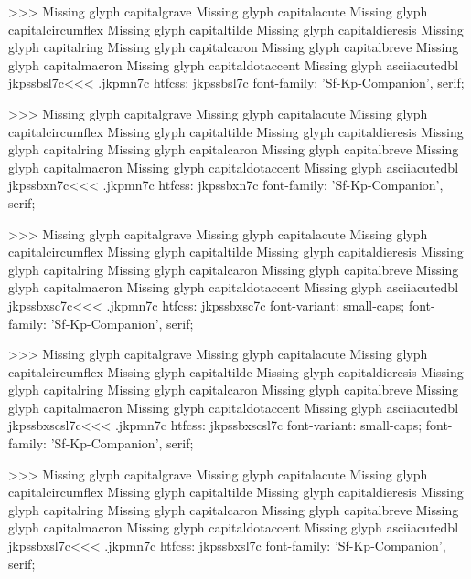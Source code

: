 >>>
Missing glyph	capitalgrave
Missing glyph	capitalacute
Missing glyph	capitalcircumflex
Missing glyph	capitaltilde
Missing glyph	capitaldieresis
Missing glyph	capitalring
Missing glyph	capitalcaron
Missing glyph	capitalbreve
Missing glyph	capitalmacron
Missing glyph	capitaldotaccent
Missing glyph	asciiacutedbl
\<jkpssbsl7c\><<<
.jkpmn7c
htfcss:  jkpssbsl7c  font-family: 'Sf-Kp-Companion', serif;

>>>
Missing glyph	capitalgrave
Missing glyph	capitalacute
Missing glyph	capitalcircumflex
Missing glyph	capitaltilde
Missing glyph	capitaldieresis
Missing glyph	capitalring
Missing glyph	capitalcaron
Missing glyph	capitalbreve
Missing glyph	capitalmacron
Missing glyph	capitaldotaccent
Missing glyph	asciiacutedbl
\<jkpssbxn7c\><<<
.jkpmn7c
htfcss:  jkpssbxn7c  font-family: 'Sf-Kp-Companion', serif;

>>>
Missing glyph	capitalgrave
Missing glyph	capitalacute
Missing glyph	capitalcircumflex
Missing glyph	capitaltilde
Missing glyph	capitaldieresis
Missing glyph	capitalring
Missing glyph	capitalcaron
Missing glyph	capitalbreve
Missing glyph	capitalmacron
Missing glyph	capitaldotaccent
Missing glyph	asciiacutedbl
\<jkpssbxsc7c\><<<
.jkpmn7c
htfcss:  jkpssbxsc7c  font-variant: small-caps; font-family: 'Sf-Kp-Companion', serif;

>>>
Missing glyph	capitalgrave
Missing glyph	capitalacute
Missing glyph	capitalcircumflex
Missing glyph	capitaltilde
Missing glyph	capitaldieresis
Missing glyph	capitalring
Missing glyph	capitalcaron
Missing glyph	capitalbreve
Missing glyph	capitalmacron
Missing glyph	capitaldotaccent
Missing glyph	asciiacutedbl
\<jkpssbxscsl7c\><<<
.jkpmn7c
htfcss:  jkpssbxscsl7c  font-variant: small-caps; font-family: 'Sf-Kp-Companion', serif;

>>>
Missing glyph	capitalgrave
Missing glyph	capitalacute
Missing glyph	capitalcircumflex
Missing glyph	capitaltilde
Missing glyph	capitaldieresis
Missing glyph	capitalring
Missing glyph	capitalcaron
Missing glyph	capitalbreve
Missing glyph	capitalmacron
Missing glyph	capitaldotaccent
Missing glyph	asciiacutedbl
\<jkpssbxsl7c\><<<
.jkpmn7c
htfcss:  jkpssbxsl7c  font-family: 'Sf-Kp-Companion', serif;

